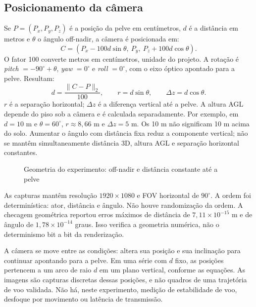 \subsection{Posicionamento da câmera}
Se $P=(P_x,P_y,P_z)$ é a posição da pelve em centímetros, $d$ é a distância em metros e $\theta$ o ângulo off-nadir, a câmera é posicionada em:
\begin{equation}
C=(P_x-100d\sin\theta,\ P_y,\ P_z+100d\cos\theta).
\end{equation}
O fator 100 converte metros em centímetros, unidade do projeto. A rotação é \textit{pitch} $=-90^\circ+\theta$, \textit{yaw} $=0^\circ$ e \textit{roll} $=0^\circ$, com o eixo óptico apontado para a pelve. Resultam:
\begin{equation}
d=\frac{\|C-P\|_2}{100},\qquad r=d\sin\theta,\qquad \Delta z=d\cos\theta.
\end{equation}
$r$ é a separação horizontal; $\Delta z$ é a diferença vertical até a pelve. A altura AGL depende do piso sob a câmera e é calculada separadamente. Por exemplo, em $d=10$ m e $\theta=60^\circ$, $r\approx8,66$ m e $\Delta z=5$ m. Os 10 m não significam 10 m acima do solo. Aumentar o ângulo com distância fixa reduz a componente vertical; não se mantêm simultaneamente distância 3D, altura AGL e separação horizontal constantes.

\begin{figure}[htb]
\caption{Geometria do experimento: off-nadir e distância constante até a pelve}
\centering
\label{fig:geometria}
\end{figure}
\FloatBarrier

As capturas mantêm resolução $1920\times1080$ e FOV horizontal de $90^\circ$. A ordem foi determinística: ator, distância e ângulo. Não houve randomização da ordem. A checagem geométrica reportou erros máximos de distância de $7,11\times10^{-15}$ m e de ângulo de $1,78\times10^{-14}$ graus. Isso verifica a geometria numérica, não o determinismo bit a bit da renderização.

A câmera se move entre as condições: altera sua posição e sua inclinação para continuar apontando para a pelve. Em uma série com $d$ fixo, as posições pertencem a um arco de raio $d$ em um plano vertical, conforme as equações. As imagens são capturas discretas dessas posições, e não quadros de uma trajetória de voo validada. Não há, neste experimento, medição de estabilidade de voo, desfoque por movimento ou latência de transmissão.

